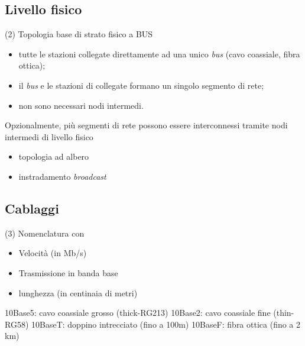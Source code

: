 \documentclass{book}
\begin{document}
\subsection{Livello fisico}
\begin{tasks}(2)
	\task Topologia base di strato fisico a BUS
	\begin{itemize}
		\item tutte le stazioni collegate direttamente ad una unico
			\textit{bus} (cavo coassiale, fibra ottica);
		\item il \textit{bus} e le stazioni di collegate formano un singolo
			segmento di rete;
		\item non sono necessari nodi intermedi.
	\end{itemize}
	\task Opzionalmente, più segmenti di rete possono essere interconnessi
	tramite nodi intermedi di livello fisico
	\begin{itemize}
		\item topologia ad albero
		\item instradamento \textit{broadcast}
	\end{itemize}
\end{tasks}
\subsection{Cablaggi}
\begin{tasks}(3)
	\task Nomenclatura con
	\begin{itemize}
		\item Velocità (in Mb/s)
		\item Trasmissione in banda base 
		\item lunghezza (in centinaia di metri)
	\end{itemize}
	\task 10Base5: cavo coassiale grosso (thick-RG213)
	\task 10Base2: cavo coassiale fine (thin-RG58)
	\task 10BaseT: doppino intrecciato (fino a 100m)
	\task 10BaseF: fibra ottica (fino a 2 km)
\end{tasks}
\end{document}
